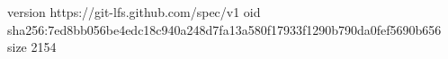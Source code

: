 version https://git-lfs.github.com/spec/v1
oid sha256:7ed8bb056be4edc18c940a248d7fa13a580f17933f1290b790da0fef5690b656
size 2154
